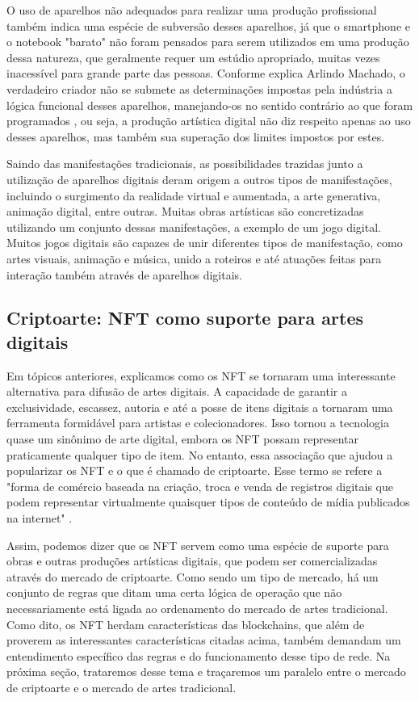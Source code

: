 O uso de aparelhos não adequados para realizar uma produção profissional também indica uma espécie de subversão desses aparelhos, já que o smartphone e o notebook "barato" não foram pensados para serem utilizados em uma produção dessa natureza, que geralmente requer um estúdio apropriado, muitas vezes inacessível para grande parte das pessoas. Conforme explica Arlindo Machado, o verdadeiro criador não se submete as determinações impostas pela indústria a lógica funcional desses aparelhos, manejando-os no sentido contrário ao que foram programados \cite{Machado}, ou seja, a produção artística digital não diz respeito apenas ao uso desses aparelhos, mas também sua superação dos limites impostos por estes. 

Saindo das manifestações tradicionais, as possibilidades trazidas junto a utilização de aparelhos digitais deram origem a outros tipos de manifestações, incluindo o surgimento da realidade virtual e aumentada, a arte generativa, animação digital, entre outras. Muitas obras artísticas são concretizadas utilizando um conjunto dessas manifestações, a exemplo de um jogo digital. Muitos jogos digitais são capazes de unir diferentes tipos de manifestação, como artes visuais, animação e música, unido a roteiros e até atuações feitas para interação também através de aparelhos digitais. 

\subsection{Criptoarte: NFT como suporte para artes digitais}
\label{subsec: criptoarte}

Em tópicos anteriores, explicamos como os NFT se tornaram uma interessante alternativa para difusão de artes digitais. A capacidade de garantir a exclusividade, escassez, autoria e até a posse de itens digitais a tornaram uma ferramenta formidável para artistas e colecionadores. Isso tornou a tecnologia quase um sinônimo de arte digital, embora  os NFT possam representar praticamente qualquer tipo de item. No entanto, essa associação que ajudou a popularizar os NFT e o que é chamado de criptoarte. Esse termo se refere a "forma de comércio baseada na criação, troca e venda de registros digitais que podem representar virtualmente quaisquer tipos de conteúdo de mídia publicados na internet" \cite{Menotti}. 

Assim, podemos dizer que os NFT servem como uma espécie de suporte para obras e outras produções artísticas digitais, que podem ser comercializadas através do mercado de criptoarte. Como sendo um tipo de mercado, há um conjunto de regras que ditam uma certa lógica de operação que não necessariamente está ligada ao ordenamento do mercado de artes tradicional. Como dito, os NFT herdam características das blockchains, que além de proverem as interessantes características citadas acima, também demandam um entendimento específico das regras e do funcionamento desse tipo de rede. Na próxima seção, trataremos desse tema e traçaremos um paralelo entre o mercado de criptoarte e o mercado de artes tradicional.


